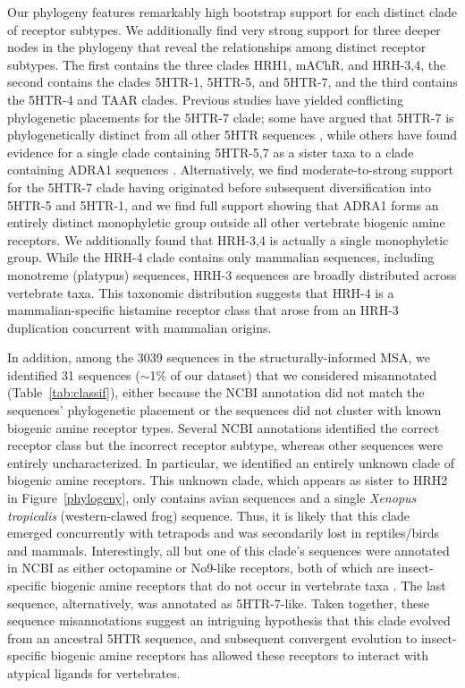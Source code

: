 \documentclass[fleqn,10pt]{wlpeerj}
\begin{document}
Our phylogeny features remarkably high bootstrap support for each distinct clade of receptor subtypes. We additionally find very strong support for three deeper nodes in the phylogeny that reveal the relationships among distinct receptor subtypes. The first contains the three clades HRH1, mAChR, and HRH-3,4, the second contains the clades 5HTR-1, 5HTR-5, and 5HTR-7, and the third contains the 5HTR-4 and TAAR clades. Previous studies have yielded conflicting phylogenetic placements for the 5HTR-7 clade; some have argued that 5HTR-7 is phylogenetically distinct from all other 5HTR sequences \citep{KakaralaJamil2014}, while others have found evidence for a single clade containing 5HTR-5,7 as a sister taxa to a clade containing ADRA1 sequences \citep{Fredrikssonetal2003}. Alternatively, we find moderate-to-strong support for the 5HTR-7 clade having originated before subsequent diversification into 5HTR-5 and 5HTR-1, and we find full support showing that ADRA1 forms an entirely distinct monophyletic group outside all other vertebrate biogenic amine receptors. We additionally found that HRH-3,4 is actually a single monophyletic group. While the HRH-4 clade contains only mammalian sequences, including monotreme (platypus) sequences, HRH-3 sequences are broadly distributed across vertebrate taxa. This taxonomic distribution suggests that HRH-4 is a mammalian-specific histamine receptor class that arose from an HRH-3 duplication concurrent with mammalian origins.

In addition, among the 3039 sequences in the structurally-informed MSA, we identified 31 sequences ($\sim$1\% of our dataset) that we considered misannotated (Table~\ref{tab:classif}), either because the NCBI annotation did not match the sequences' phylogenetic placement or the sequences did not cluster with known biogenic amine receptor types. Several NCBI annotations identified the correct receptor class but the incorrect receptor subtype, whereas other sequences were entirely uncharacterized. In particular, we identified an entirely unknown clade of biogenic amine receptors. This unknown clade, which appears as sister to HRH2 in Figure~\ref{phylogeny}, only contains avian sequences and a single \emph{Xenopus tropicalis} (western-clawed frog) sequence. Thus, it is likely that this clade emerged concurrently with tetrapods and was secondarily lost in reptiles/birds and mammals. Interestingly, all but one of this clade's sequences were annotated in NCBI as either octopamine or No9-like receptors, both of which are insect-specific biogenic amine receptors that do not occur in vertebrate taxa \citep{Roeder2005}. The last sequence, alternatively, was annotated as 5HTR-7-like. Taken together, these sequence misannotations suggest an intriguing hypothesis that this clade evolved from an ancestral 5HTR sequence, and subsequent convergent evolution to insect-specific biogenic amine receptors has allowed these receptors to interact with atypical ligands for vertebrates.
\end{document}

